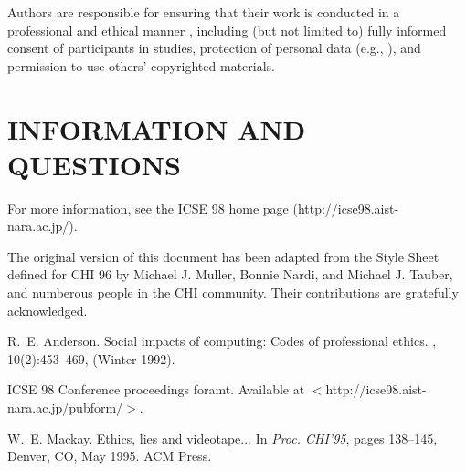 Authors are responsible for ensuring that their work is 
conducted in a professional and ethical manner \cite{Anderson:Impacts}, 
including (but not limited to) fully informed consent of 
participants in studies, protection of personal data 
(e.g., \cite{Mackay:Ethics}), 
and permission to use others' copyrighted materials.

\section{INFORMATION AND QUESTIONS}

For more information, see the ICSE 98 home page
(http://icse98.aist-nara.ac.jp/).

\acknowledgements

The original version of this document has been adapted from the
Style Sheet defined for CHI 96 by Michael J. Muller, Bonnie Nardi, and 
Michael J. Tauber, and numberous people in the CHI 
community. Their contributions are gratefully acknowledged.


\begin{thebibliography}{1}

R.~E. Anderson.
\newblock Social impacts of computing: {C}odes of professional ethics.
, 10(2):453--469, (Winter 1992).

ICSE 98 {C}onference proceedings foramt. {A}vailable at
  $<$http://icse98.aist-nara.ac.jp/pubform/$>$.

W.~E. Mackay.
\newblock Ethics, lies and videotape...
\newblock In {\em Proc. CHI'95}, pages 138--145, Denver, CO, May 1995. ACM
  Press.

\end{thebibliography}

